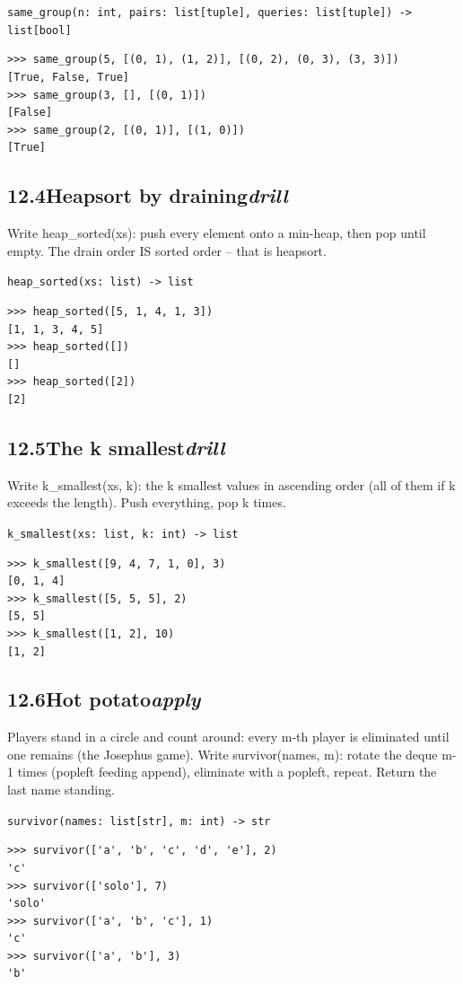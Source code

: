 \documentclass[10pt,letterpaper]{book}
\begin{document}
\noindent\texttt{same\_group(n: int, pairs: list[tuple], queries: list[tuple]) -> list[bool]}
\begin{lstlisting}[style=ex]
>>> same_group(5, [(0, 1), (1, 2)], [(0, 2), (0, 3), (3, 3)])
[True, False, True]
>>> same_group(3, [], [(0, 1)])
[False]
>>> same_group(2, [(0, 1)], [(1, 0)])
[True]
\end{lstlisting}
\subsection*{12.4\quad Heapsort by draining\hfill\textnormal{\textit{drill}}}
Write heap\_sorted(xs): push every element onto a min-heap, then pop until empty. The drain order IS sorted order -- that is heapsort.

\noindent\texttt{heap\_sorted(xs: list) -> list}
\begin{lstlisting}[style=ex]
>>> heap_sorted([5, 1, 4, 1, 3])
[1, 1, 3, 4, 5]
>>> heap_sorted([])
[]
>>> heap_sorted([2])
[2]
\end{lstlisting}
\subsection*{12.5\quad The k smallest\hfill\textnormal{\textit{drill}}}
Write k\_smallest(xs, k): the k smallest values in ascending order (all of them if k exceeds the length). Push everything, pop k times.

\noindent\texttt{k\_smallest(xs: list, k: int) -> list}
\begin{lstlisting}[style=ex]
>>> k_smallest([9, 4, 7, 1, 0], 3)
[0, 1, 4]
>>> k_smallest([5, 5, 5], 2)
[5, 5]
>>> k_smallest([1, 2], 10)
[1, 2]
\end{lstlisting}
\subsection*{12.6\quad Hot potato\hfill\textnormal{\textit{apply}}}
Players stand in a circle and count around: every m-th player is eliminated until one remains (the Josephus game). Write survivor(names, m): rotate the deque m-1 times (popleft feeding append), eliminate with a popleft, repeat. Return the last name standing.

\noindent\texttt{survivor(names: list[str], m: int) -> str}
\begin{lstlisting}[style=ex]
>>> survivor(['a', 'b', 'c', 'd', 'e'], 2)
'c'
>>> survivor(['solo'], 7)
'solo'
>>> survivor(['a', 'b', 'c'], 1)
'c'
>>> survivor(['a', 'b'], 3)
'b'
\end{lstlisting}
\end{document}
